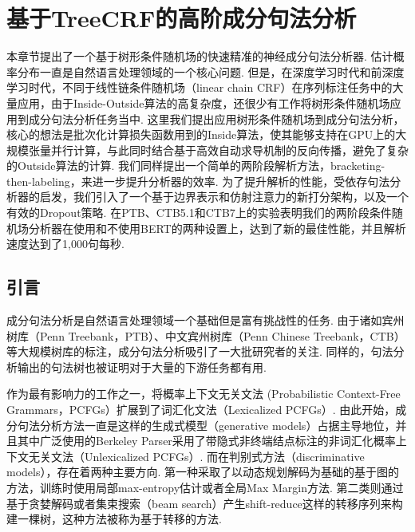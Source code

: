\chapter{基于TreeCRF的高阶成分句法分析}
\label{cha:con-crf}

本章节提出了一个基于树形条件随机场的快速精准的神经成分句法分析器.
估计概率分布一直是自然语言处理领域的一个核心问题.
但是，在深度学习时代和前深度学习时代，不同于线性链条件随机场（linear chain CRF）在序列标注任务中的大量应用，由于Inside-Outside算法的高复杂度，还很少有工作将树形条件随机场应用到成分句法分析任务当中.
这里我们提出应用树形条件随机场到成分句法分析，核心的想法是批次化计算损失函数用到的Inside算法，使其能够支持在GPU上的大规模张量并行计算，与此同时结合基于高效自动求导机制的反向传播，避免了复杂的Outside算法的计算.
我们同样提出一个简单的两阶段解析方法，bracketing-then-labeling，来进一步提升分析器的效率.
为了提升解析的性能，受依存句法分析器的启发，我们引入了一个基于边界表示和仿射注意力的新打分架构，以及一个有效的Dropout策略.
在PTB、CTB5.1和CTB7上的实验表明我们的两阶段条件随机场分析器在使用和不使用BERT的两种设置上，达到了新的最佳性能，并且解析速度达到了1,000句每秒.

\section{引言}\label{sec:con-intro}

成分句法分析是自然语言处理领域一个基础但是富有挑战性的任务.
由于诸如宾州树库（Penn Treebank，PTB）、中文宾州树库（Penn Chinese Treebank，CTB）等大规模树库的标注，成分句法分析吸引了一大批研究者的关注.
同样的，句法分析输出的句法树也被证明对于大量的下游任务\citep{akoury-etal-2019-syntactically,wang-etal-2018-tree}都有用.

作为最有影响力的工作之一，\cite{collins-1997-three}将概率上下文无关文法 (Probabilistic Context-Free Grammars，PCFGs）扩展到了词汇化文法（Lexicalized PCFGs）.
由此开始，成分句法分析方法一直是这样的生成式模型（generative models）占据主导地位，并且其中广泛使用的Berkeley Parser采用了带隐式非终端结点标注的非词汇化概率上下文无关文法（Unlexicalized PCFGs）\citep{matsuzaki-etal-2005-probabilistic,petrov-klein-2007-improved}.
而在判别式方法（discriminative models），存在着两种主要方向.
第一种采取了以动态规划解码为基础的基于图的方法，训练时使用局部max-entropy估计\citep{kaplan-etal-2004-speed}或者全局Max Margin方法\citep{taskar-etal-2004-max}.
第二类则通过基于贪婪解码或者集束搜索（beam search）产生shift-reduce这样的转移序列来构建一棵树，这种方法被称为基于转移的方法\citep{sagae-lavie-2005-classifier,zhu-etal-2013-fast}.

